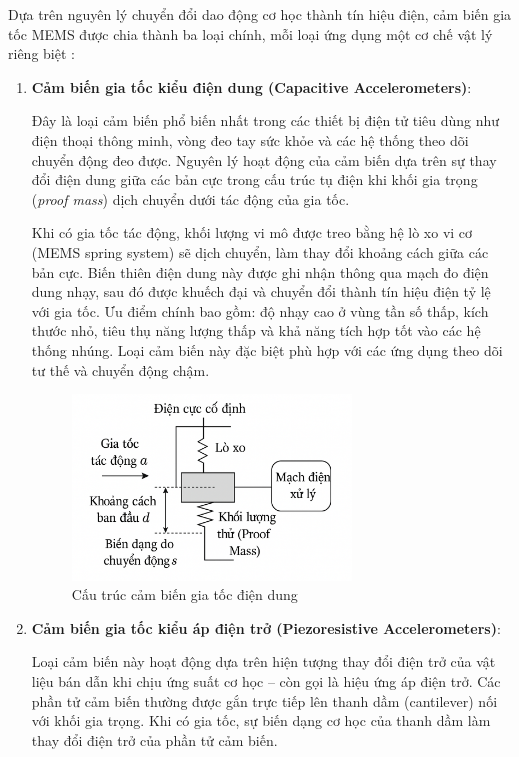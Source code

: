 Dựa trên nguyên lý chuyển đổi dao động cơ học thành tín hiệu điện, cảm biến gia tốc MEMS được chia thành ba loại chính, mỗi loại ứng dụng một cơ chế vật lý riêng biệt \cite{Acce, cambien}:

\begin{enumerate}
    \item \textbf{Cảm biến gia tốc kiểu điện dung (Capacitive Accelerometers)}:
    
    Đây là loại cảm biến phổ biến nhất trong các thiết bị điện tử tiêu dùng như điện thoại thông minh, vòng đeo tay sức khỏe và các hệ thống theo dõi chuyển động đeo được. Nguyên lý hoạt động của cảm biến dựa trên sự thay đổi điện dung giữa các bản cực trong cấu trúc tụ điện khi khối gia trọng (\textit{proof mass}) dịch chuyển dưới tác động của gia tốc.

    Khi có gia tốc tác động, khối lượng vi mô được treo bằng hệ lò xo vi cơ (MEMS spring system) sẽ dịch chuyển, làm thay đổi khoảng cách giữa các bản cực. Biến thiên điện dung này được ghi nhận thông qua mạch đo điện dung nhạy, sau đó được khuếch đại và chuyển đổi thành tín hiệu điện tỷ lệ với gia tốc. Ưu điểm chính bao gồm: độ nhạy cao ở vùng tần số thấp, kích thước nhỏ, tiêu thụ năng lượng thấp và khả năng tích hợp tốt vào các hệ thống nhúng. Loại cảm biến này đặc biệt phù hợp với các ứng dụng theo dõi tư thế và chuyển động chậm.

    \begin{figure}[H]
        \centering
        \includegraphics[width=0.7\textwidth]{images/diendung.png}
        \vspace*{-7mm}
        \caption{Cấu trúc cảm biến gia tốc điện dung}
        \label{acce_mems}
    \end{figure}

    \item \textbf{Cảm biến gia tốc kiểu áp điện trở (Piezoresistive Accelerometers)}:
    
    Loại cảm biến này hoạt động dựa trên hiện tượng thay đổi điện trở của vật liệu bán dẫn khi chịu ứng suất cơ học – còn gọi là hiệu ứng áp điện trở. Các phần tử cảm biến thường được gắn trực tiếp lên thanh dầm (cantilever) nối với khối gia trọng. Khi có gia tốc, sự biến dạng cơ học của thanh dầm làm thay đổi điện trở của phần tử cảm biến.


\end{enumerate}
